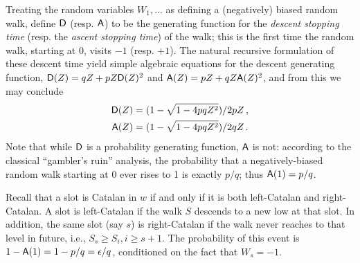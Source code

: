   Treating the random variables $W_1, \ldots$ as
  defining a (negatively) biased random walk, define $\mathsf{D}$ (resp. $\mathsf{A}$) to be
  the generating function for the \emph{descent stopping time} 
  (resp. the \emph{ascent stopping time}) 
  of the walk; this is the first time the random walk, starting at 0, visits
  $-1$ (resp. $+1$). 
  The natural recursive formulation of these descent time yield 
  simple algebraic equations for the descent generating function,
  $\mathsf{D}(Z) = qZ + pZ \mathsf{D}(Z)^2$ and $\mathsf{A}(Z) = pZ + qZ \mathsf{A}(Z)^2$, 
  and from this we may conclude
  \begin{align*}
    \mathsf{D}(Z) &= (1 - \sqrt{1 - 4pqZ^2})/2pZ\,, \\
    \mathsf{A}(Z) &= (1 - \sqrt{1 - 4pqZ^2})/2qZ\,.
  \end{align*}
  Note that while $\mathsf{D}$ is a probability generating function, 
  $\mathsf{A}$ is not: according to the classical
  ``gambler's ruin'' analysis,
  the probability
  that a negatively-biased random walk starting at 0 ever rises to 1
  is exactly $p/q$; thus $\mathsf{A}(1) = p/q$.

  Recall that a slot is Catalan in $w$ if and only if 
  it is both left-Catalan and right-Catalan. 
  A slot is left-Catalan if the walk $S$ descends to a new low at that slot. 
  In addition, the same slot (say $s$) is right-Catalan 
  if the walk never reaches to that level in future, 
  i.e., $S_s \geq S_{i}, i \geq s + 1$. 
  The probability of this event is $1 - \mathsf{A}(1) = 1 - p/q = \epsilon/q$, 
  conditioned on the fact that $W_s = -1$.
  
